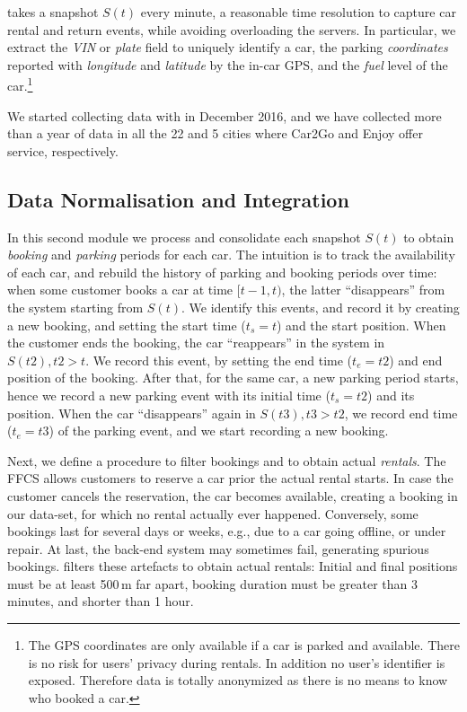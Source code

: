 \tool takes a snapshot $S(t)$ every minute, a reasonable time resolution to capture car rental and return events, while avoiding overloading the servers.
In particular, we extract 
the \textit{VIN} or \textit{plate} field to uniquely identify a car, the parking \textit{coordinates} reported with \textit{longitude} and \textit{latitude} by the in-car GPS, and the \textit{fuel} level of the car.\footnote{The GPS coordinates are only available if a car is parked and available. There is no risk for users' privacy during rentals. In addition no user's identifier is exposed. Therefore data is totally anonymized as there is no means to know who booked a car.}


We started collecting data with \tool in December 2016, and we have collected more than a year of data in all the 22 and 5 cities where Car2Go and Enjoy offer service, respectively. 

\subsection{Data Normalisation and Integration}

In this second module we process and consolidate each snapshot $S(t)$ to obtain \textit{booking} and \textit{parking} periods for each car. The intuition is to track the availability of each car, and rebuild the history of parking and booking periods over time: when some customer books a car at time $[t-1,t)$, the latter ``disappears'' from the system starting from $S(t)$. We identify this events, and record it by creating a new booking, and setting the start time ($t_s=t$) and the start position. When the customer ends the booking, the car ``reappears'' in the system in $S(t2), t2>t$. We record this event, by setting the end time ($t_e=t2$) and end position of the booking. After that, for the same car, a new parking period starts, hence we record a new parking event with its initial time ($t_s=t2$) and its position. When the car ``disappears'' again in $S(t3),t3>t2$, we record end time ($t_e=t3$) of the parking event, and we start recording a new booking.
 
Next, we define a procedure to filter bookings and to obtain actual \textit{rentals}. The FFCS allows customers to reserve a car prior the actual rental starts. In case the customer cancels the reservation, the car becomes available, creating a booking in our data-set, for which no rental actually ever happened. Conversely, some bookings last for several days or weeks, e.g., due to a car going offline, or under repair. At last, the back-end system may sometimes fail, generating spurious bookings. \tool filters these artefacts to obtain actual {rentals}: Initial  and final positions must be at least 500\,m far apart, booking duration must be greater than 3 minutes, and shorter than 1 hour. %


